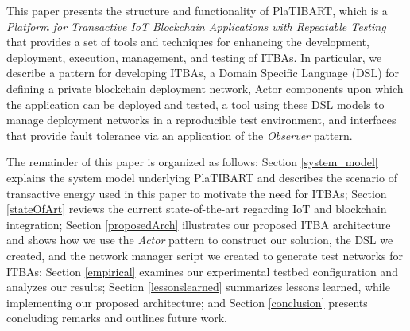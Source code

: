 











This paper presents the structure and functionality of PlaTIBART, which is a \textit{Platform for Transactive IoT Blockchain Applications with Repeatable Testing} that provides a set of tools and techniques for enhancing the development, deployment, execution, management, and testing of ITBAs. In particular, we describe a pattern for developing ITBAs, a Domain Specific Language (DSL) for defining a private blockchain deployment network, Actor components upon which the application can be deployed and tested, a tool using these DSL models to manage deployment networks in a reproducible test environment, and interfaces that provide fault tolerance via an application of the \textit{Observer} pattern. 

The remainder of this paper is organized as follows: 
Section \ref{system_model} explains the system model underlying PlaTIBART and describes the scenario of transactive energy used in this paper to motivate the need for ITBAs;
Section \ref{stateOfArt} reviews the current state-of-the-art regarding IoT and blockchain integration;
Section \ref{proposedArch} illustrates our proposed ITBA architecture and shows how we use the \textit{Actor} pattern to construct our solution, the DSL we created, and the network manager script we created to generate  test networks for ITBAs; Section \ref{empirical} examines our experimental testbed configuration and analyzes our results; Section \ref{lessonslearned} summarizes lessons learned, while implementing our proposed architecture; and Section \ref{conclusion} presents concluding remarks and outlines future work. 

